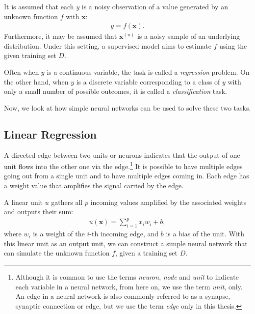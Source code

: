 \documentclass[dissertation,nocontribution]{aaltoseries}
\newcommand{\vect}[1]{\mathbf{#1}}
\newcommand{\vx}[0]{\vect{x}}
\begin{document}
It is assumed that each $y$ is a noisy observation of a
value generated by an unknown function $f$ with $\vx$:
\begin{align}
    \label{eq:linreg_gen}
    y = f(\vx).
\end{align}
Furthermore, it may be
assumed that $\vx^{(n)}$ is a noisy sample of an underlying
distribution.  Under this setting, a supervised model aims
to estimate $f$ using the given training set $D$.

Often when $y$ is a continuous variable,
the task is called a \textit{regression} problem.
On the other hand, when $y$ is a discrete variable 
corresponding to a class of $y$ with only a small number of
possible outcomes, it is called a \textit{classification}
task.

Now, we look at how simple neural networks can be used to
solve these two tasks.

\subsection{Linear Regression}
\label{sec:linear_regression}

A directed edge between two units or neurons indicates that
the output of one unit flows into the other one via the
edge.\footnote{Although it is common to use the terms
\textit{neuron}, \textit{node} and \textit{unit} to indicate
each variable in a neural network, from here on, we use the
term \textit{unit}, only. An edge in a neural network is
also commonly referred to as a synapse, synaptic connection
or edge, but we use the term \textit{edge} only in this
thesis.} It is possible to have multiple edges going out
from a single unit and to have multiple edges coming in.
Each edge has a weight value that amplifies the signal
carried by the edge.

A linear unit $u$ gathers all $p$ incoming values amplified
by the associated weights and outputs their sum:
\begin{align}
    \label{eq:linear_unit}
    u(\vx) = \sum_{i=1}^p x_i w_i + b, 
\end{align}
where $w_i$ is a weight of the $i$-th incoming edge, and $b$
is a bias of the unit.  With this linear unit as an output
unit, we can construct a simple neural network that can
simulate the unknown function $f$, given a training set $D$. 
\end{document}
